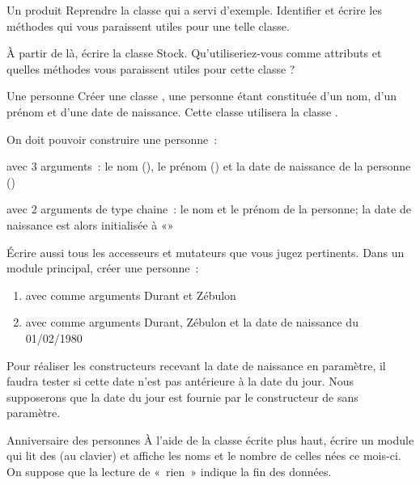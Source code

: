 \begin{Exercice}{Un produit}
	Reprendre la classe  qui a servi
	d'exemple. Identifier et écrire les méthodes qui vous
	paraissent utiles pour une telle classe.
	
	À partir de là, écrire la classe Stock. Qu'utiliseriez-vous 
	comme attributs et quelles méthodes vous paraissent utiles pour
	cette classe ?
\end{Exercice}

\begin{Exercice}{Une personne}
	Créer une classe , une personne étant
	constituée d'un nom, d'un prénom et
	d'une date de naissance. Cette classe utilisera la
	classe .

	On doit pouvoir construire une personne~:

	\begin{liste}
		\item 
			avec 3 arguments~: le nom (), le prénom
			() et la date de naissance de la personne
			()
		\item 
			avec 2 arguments de type chaine~: le nom et le prénom de la personne; la
			date de naissance est alors initialisée à «»
	\end{liste}

	Écrire aussi tous les accesseurs et mutateurs que vous jugez
	pertinents. Dans un module principal, créer une personne~:

	\begin{enumerate}[label=\alph*)]
		\item 
			avec comme arguments {\textquotedbl}Durant{\textquotedbl} et
			{\textquotedbl}Zébulon{\textquotedbl}
		\item 
			avec comme arguments {\textquotedbl}Durant{\textquotedbl},
			{\textquotedbl}Zébulon{\textquotedbl} et la date de naissance du
			01/02/1980
	\end{enumerate}

	Pour réaliser les constructeurs recevant la date de naissance en
	paramètre, il faudra tester si cette date n’est pas antérieure à la
	date du jour. Nous supposerons que la date 
	du jour est fournie par le constructeur de
	 sans paramètre.
\end{Exercice}

\begin{Exercice}{Anniversaire des personnes}
	À l'aide de la classe  écrite plus haut,
	écrire un module qui lit des  (au clavier)
	et affiche les noms et le nombre de celles nées ce mois-ci. On suppose
	que la lecture de «~rien~» indique la fin des données.
\end{Exercice}

